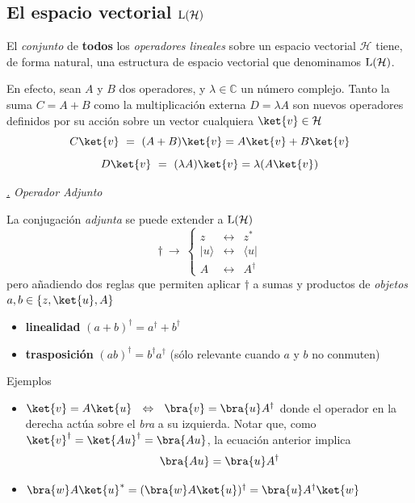 \documentclass[a4paper,11pt]{book} %
\numberwithin{equation}{chapter}
\def\subsubiContadorIt{\par\addtocounter{subsubsection}{1}\underline{\it\thesubsubsection.}\hskip0.5cm \setcounter{subsubsubsectionIt}{0}}
\newcommand{\SubsubiIt}[1]{
		\subsubiContadorIt \textit{#1}
	}
\newcounter{subsubsubsectionIt}[subsubsection]
\begin{document}
		\subsection{El espacio vectorial ${\rm L}(\mathcal{H})$}

El \textit{conjunto} de \textbf{todos} los \textit{operadores lineales} sobre un espacio vectorial $\mathcal{H}$ tiene, de forma natural, una estructura de espacio vectorial que denominamos ${\rm L}(\mathcal{H})$.

En efecto, sean $A$ y $B$ dos operadores, y $\lambda\in {\mathbb{C}}$ un número complejo. Tanto la suma $C = A+B$ como la multiplicación externa $D=\lambda A$ son nuevos operadores definidos por su acción sobre un vector cualquiera $\ket{v}\in \mathcal{H}$
	\begin{equation}
	C\ket{v} ~=~ (A + B) \ket{v} = A\ket{v} + B\ket{v}
	\end{equation}
	\begin{equation}
	D\ket{v} ~=~ (\lambda A) \ket{v} = \lambda (A\ket{v})
	\end{equation}


			\SubsubiIt{Operador Adjunto}

La conjugación \textit{adjunta} se puede extender a ${\rm L}(\mathcal{H})$
	\begin{equation}
	\dagger ~\to ~
\left\{
\begin{matrix}
z & \leftrightarrow  &  z^* \\
|u\rangle & \leftrightarrow &   \langle u | \\
A & \leftrightarrow & A^{\dagger}
\end{matrix}
\right.
	\end{equation}
pero añadiendo dos reglas que permiten aplicar $\dagger$ a sumas y productos de \textit{objetos} $a,b \in\{z,\ket{u},A\}$
\begin{itemize}
	\item \textbf{linealidad} $( a + b)^\dagger = a^\dagger + b^\dagger $
	\item \textbf{trasposición} $(ab)^\dagger = b^\dagger a^\dagger$ (sólo relevante cuando $a$ y $b$ no conmuten)
\end{itemize}

	\begin{mybox_green}{Ejemplos}
	\begin{itemize}
		\item $\ket{v} = A\ket{u} ~~\Leftrightarrow ~~\bra{v} = \bra{u}A^\dagger$ donde el operador en la derecha actúa sobre el \textit{bra} a su izquierda.
		Notar que, como $\ket{v}^\dagger=\ket{Au}^\dagger = \bra{Au}$, la ecuación anterior implica
		\begin{equation}
		\bra{Au} = \bra{u} A^\dagger
		\end{equation}
		\item $\bra{w}A\ket{u}^* = (\bra{w}A\ket{u})^\dagger = \bra{u}A^\dagger\ket{w}$

	\end{itemize}
	\end{mybox_green}
\end{document}
